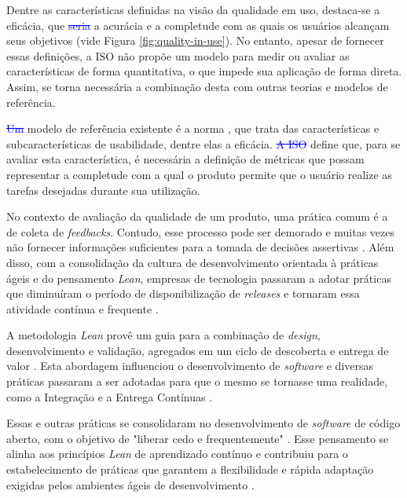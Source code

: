 Dentre as características definidas na visão da  qualidade em uso, destaca-se a eficácia, que \textcolor{blue}{\st{seria}}  a acurácia e a completude com as quais os usuários alcançam seus objetivos (vide Figura \ref{fig:quality-in-use}). No entanto, apesar de fornecer essas definições, a ISO não propõe um modelo para medir ou avaliar as características de forma quantitativa, o que impede sua aplicação de forma direta. Assim, se torna necessária a combinação desta com outras teorias e modelos de referência.

\textcolor{blue}{\st{Um}}  modelo de referência existente é a norma ,  que trata das características e subcaracterísticas de usabilidade, dentre elas a eficácia. \textcolor{blue}{\st{A  ISO}}  define que, para se avaliar esta característica, é necessária a definição de métricas que possam representar a completude com a qual o produto permite que o usuário realize as tarefas desejadas durante sua utilização.



No contexto de avaliação da qualidade de um produto, uma prática comum é a de coleta de \textit{feedbacks}. Contudo, esse processo pode ser demorado e muitas vezes não fornecer informações suficientes para a tomada de decisões assertivas \cite{olsson_opinions_2014}. Além disso, com a consolidação da cultura de desenvolvimento orientada à práticas ágeis e   do pensamento \textit{Lean}, empresas de tecnologia passaram a adotar práticas que diminuíram o período de disponibilização de \textit{releases} e tornaram essa atividade contínua e frequente \cite{kevic_characterizing_2017}.

A metodologia \textit{Lean} provê um guia para a combinação de \textit{design}, desenvolvimento e validação, agregados em um ciclo de descoberta e entrega de valor \cite{fagerholm_right_2017}. Esta abordagem influenciou o desenvolvimento de \textit{software} e diversas práticas passaram a ser adotadas para que o mesmo se tornasse uma realidade, como a Integração e a Entrega Contínuas \cite{fitzgerald2015continuous}.

Essas e outras práticas se consolidaram no desenvolvimento de \textit{software} de código aberto, com o objetivo de "liberar cedo e frequentemente" \cite{feller2005perspectives}. Esse pensamento se alinha aos princípios \textit{Lean} de aprendizado contínuo e contribuiu para o estabelecimento de práticas que garantem a flexibilidade e rápida adaptação exigidas pelos ambientes ágeis de desenvolvimento \cite{fitzgerald2015continuous}.

